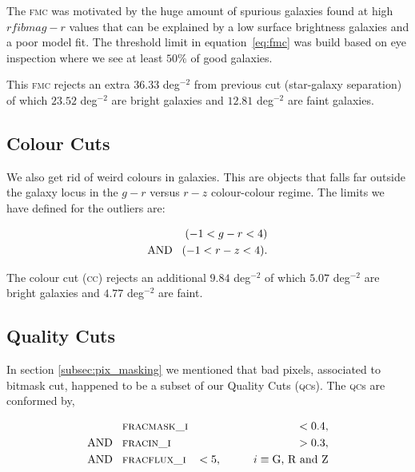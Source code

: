 \documentclass[fleqn,usenatbib]{mnras}
\newcommand{\CC}{\textsc{cc}\xspace}
\newcommand{\FMC}{{\textsc{fmc}}\xspace}
\newcommand{\QCs}{\textsc{qc}s\xspace}
\begin{document}
The \FMC was motivated by the huge amount of spurious galaxies found at high $rfibmag - r$ values that can be explained by a low surface brightness galaxies and a poor model fit. The threshold limit in equation~\ref{eq:fmc} was build based on eye inspection where we see at least $50 \%$ of good galaxies.


This \FMC rejects an extra $36.33$ deg$^{-2}$ from previous cut (star-galaxy separation) of which $23.52$ deg$^{-2}$ are bright galaxies and $12.81$ deg$^{-2}$ are faint galaxies.

\subsection{Colour Cuts}

We also get rid of weird colours in galaxies. This are objects that falls far outside the galaxy locus in the $g-r$ versus $r-z$ colour-colour regime. The limits we have defined for the outliers are:

\begin{eqnarray}
    (-1 < g-r < 4) \nonumber \\
    \text{AND} \hspace{3mm} (-1 < r-z < 4).
\end{eqnarray}

The colour cut (\CC) rejects an additional $9.84$ deg$^{-2}$ of which $5.07$ deg$^{-2}$ are bright galaxies and $4.77$ deg$^{-2}$ are faint.

\subsection{Quality Cuts}
\label{sec:QC}

In section \ref{subsec:pix_masking} we mentioned that bad pixels, associated to bitmask cut, happened to be a subset of our Quality Cuts (\QCs). The \QCs are conformed by,

\begin{eqnarray}
    &\textsc{fracmask\_i}& < 0.4, \nonumber \\
    \text{AND} \hspace{3mm} &\textsc{fracin\_i}& > 0.3, \nonumber \\
    \text{AND} \hspace{3mm} &\textsc{fracflux\_i}& < 5, \hspace{1cm} i \equiv  \textrm{G, R and Z}
\end{eqnarray}
\end{document}
